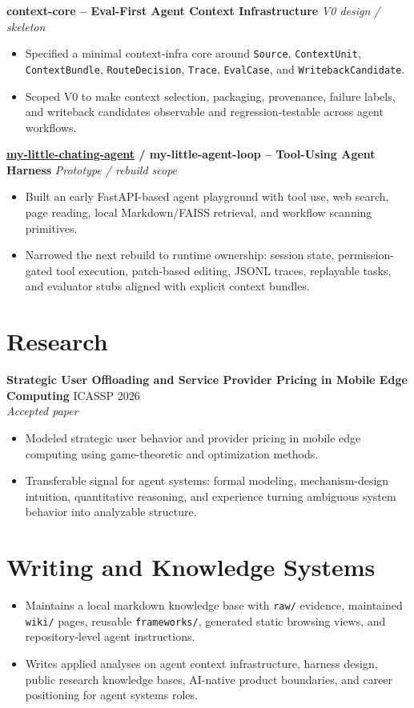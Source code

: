 \documentclass[10pt,letterpaper]{article}
\newcommand{\resumeItem}[1]{\item #1}
\newcommand{\resumeSubheading}[4]{
  \textbf{#1} \hfill #2 \\
  \textit{#3} \hfill \textit{#4}
}
\newcommand{\projectHeading}[2]{
  \textbf{#1} \hfill \textit{#2}
}
\begin{document}
\projectHeading{context-core -- Eval-First Agent Context Infrastructure}{V0 design / skeleton}
\begin{itemize}
  \resumeItem{Specified a minimal context-infra core around \texttt{Source}, \texttt{ContextUnit}, \texttt{ContextBundle}, \texttt{RouteDecision}, \texttt{Trace}, \texttt{EvalCase}, and \texttt{WritebackCandidate}.}
  \resumeItem{Scoped V0 to make context selection, packaging, provenance, failure labels, and writeback candidates observable and regression-testable across agent workflows.}
\end{itemize}

\projectHeading{\href{https://github.com/Barytes/my-little-chating-agent}{my-little-chating-agent} / my-little-agent-loop -- Tool-Using Agent Harness}{Prototype / rebuild scope}
\begin{itemize}
  \resumeItem{Built an early FastAPI-based agent playground with tool use, web search, page reading, local Markdown/FAISS retrieval, and workflow scanning primitives.}
  \resumeItem{Narrowed the next rebuild to runtime ownership: session state, permission-gated tool execution, patch-based editing, JSONL traces, replayable tasks, and evaluator stubs aligned with explicit context bundles.}
\end{itemize}

\section{Research}

\resumeSubheading{Strategic User Offloading and Service Provider Pricing in Mobile Edge Computing}{ICASSP 2026}
{Accepted paper}{}
\begin{itemize}
  \resumeItem{Modeled strategic user behavior and provider pricing in mobile edge computing using game-theoretic and optimization methods.}
  \resumeItem{Transferable signal for agent systems: formal modeling, mechanism-design intuition, quantitative reasoning, and experience turning ambiguous system behavior into analyzable structure.}
\end{itemize}

\section{Writing and Knowledge Systems}
\begin{itemize}
  \resumeItem{Maintains a local markdown knowledge base with \texttt{raw/} evidence, maintained \texttt{wiki/} pages, reusable \texttt{frameworks/}, generated static browsing views, and repository-level agent instructions.}
  \resumeItem{Writes applied analyses on agent context infrastructure, harness design, public research knowledge bases, AI-native product boundaries, and career positioning for agent systems roles.}
\end{itemize}
\end{document}
